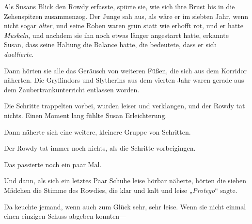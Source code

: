 Als Susans Blick den Rowdy erfasste, spürte sie, wie sich ihre Brust bis in die Zehenspitzen zusammenzog. Der Junge sah aus, als wäre er im siebten Jahr, wenn nicht sogar \emph{älter}, und seine Roben waren grün statt wie erhofft rot, und er hatte \emph{Muskeln}, und nachdem sie ihn noch etwas länger angestarrt hatte, erkannte Susan, dass seine Haltung die Balance hatte, die bedeutete, dass er sich \emph{duellierte}.

Dann hörten sie alle das Geräusch von weiteren Füßen, die sich aus dem Korridor näherten. Die Gryffindors und Slytherins aus dem vierten Jahr waren gerade aus dem Zaubertrankunterricht entlassen worden.

Die Schritte trappelten vorbei, wurden leiser und verklangen, und der Rowdy tat nichts. Einen Moment lang fühlte Susan Erleichterung.

Dann näherte sich eine weitere, kleinere Gruppe von Schritten.

Der Rowdy tat immer noch nichts, als die Schritte vorbeigingen.

Das passierte noch ein paar Mal.

Und dann, als sich ein letztes Paar Schuhe leise hörbar näherte, hörten die sieben Mädchen die Stimme des Rowdies, die klar und kalt und leise „\emph{Protego}“ sagte.

Da keuchte jemand, wenn auch zum Glück sehr, sehr leise. Wenn sie nicht einmal einen einzigen Schuss abgeben konnten—

